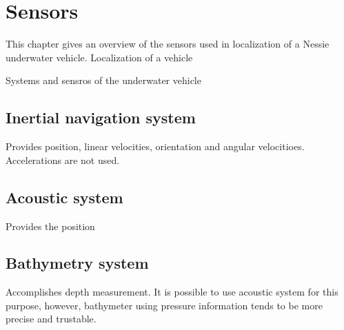 \chapter{Sensors} \label{chap:sensors}

This chapter gives an overview of the sensors used in localization of a Nessie underwater vehicle. Localization of a vehicle 

Systems and sensros of the underwater vehicle

\section{Inertial navigation system}
Provides position, linear velocities, orientation and angular velocitioes. Accelerations are not used. 
\section{Acoustic system}
Provides the position
\section{Bathymetry system}
Accomplishes depth measurement. It is possible to use acoustic system for this purpose, however, bathymeter using pressure information tends to be more precise and trustable.